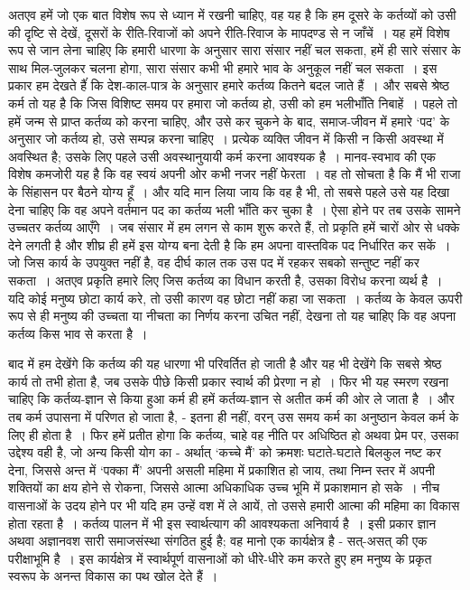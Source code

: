 अतएव हमें जो एक बात विशेष रूप से ध्यान में रखनी चाहिए, वह यह है कि हम दूसरे के कर्तव्यों को उसी की दृष्टि से देखें, दूसरों के रीति-रिवाजों को अपने रीति-रिवाज के मापदण्ड से न जाँचें~। यह हमें विशेष रूप से जान लेना चाहिए कि हमारी धारणा के अनुसार सारा संसार नहीं चल सकता, हमें ही सारे संसार के साथ मिल-जुलकर चलना होगा, सारा संसार कभी भी हमारे भाव के अनुकूल नहीं चल सकता~। इस प्रकार हम देखते हैंं कि देश-काल-पात्र के अनुसार हमारे कर्तव्य कितने बदल जाते हैं~। और सबसे श्रेष्ठ कर्म तो यह है कि जिस विशिष्ट समय पर हमारा जो कर्तव्य हो, उसी को हम भलीभाँति निबाहें~। पहले तो हमें जन्म से प्राप्त कर्तव्य को करना चाहिए, और उसे कर चुकने के बाद, समाज-जीवन में हमारे ‘पद’ के अनुसार जो कर्तव्य हो, उसे सम्पन्न करना चाहिए~। प्रत्येक व्यक्ति जीवन में किसी न किसी अवस्था में अवस्थित है; उसके लिए पहले उसी अवस्थानुयायी कर्म करना आवश्यक है~। मानव-स्वभाव की एक विशेष कमजोरी यह है कि वह स्वयं अपनी ओर कभी नजर नहीं फेरता~। वह तो सोचता है कि मैं भी राजा के सिंहासन पर बैठने योग्य हूँ~। और यदि मान लिया जाय कि वह है भी, तो सबसे पहले उसे यह दिखा देना चाहिए कि वह अपने वर्तमान पद का कर्तव्य भली भाँति कर चुका है~। ऐसा होने पर तब उसके सामने उच्चतर कर्तव्य आएँगे~। जब संसार में हम लगन से काम शुरू करते हैं, तो प्रकृति हमें चारों ओर से धक्के देने लगती है और शीघ्र ही हमें इस योग्य बना देती है कि हम अपना वास्तविक पद निर्धारित कर सकें~। जो जिस कार्य के उपयुक्त नहीं है, वह दीर्घ काल तक उस पद में रहकर सबको सन्तुष्ट नहीं कर सकता~। अतएव प्रकृति हमारे लिए जिस कर्तव्य का विधान करती है, उसका विरोध करना व्यर्थ है~। यदि कोई मनुष्य छोटा कार्य करे, तो उसी कारण वह छोटा नहीं कहा जा सकता~। कर्तव्य के केवल ऊपरी रूप से ही मनुष्य की उच्चता या नीचता का निर्णय करना उचित नहीं, देखना तो यह चाहिए कि वह अपना कर्तव्य किस भाव से करता है~।

बाद में हम देखेंगे कि कर्तव्य की यह धारणा भी परिवर्तित हो जाती है और यह भी देखेंगे कि सबसे श्रेष्ठ कार्य तो तभी होता है, जब उसके पीछे किसी प्रकार स्वार्थ की प्रेरणा न हो~। फिर भी यह स्मरण रखना चाहिए कि कर्तव्य-ज्ञान से किया हुआ कर्म ही हमें कर्तव्य-ज्ञान से अतीत कर्म की ओर ले जाता है~। और तब कर्म उपासना में परिणत हो जाता है, - इतना ही नहीं, वरन् उस समय कर्म का अनुष्ठान केवल कर्म के लिए ही होता है~। फिर हमें प्रतीत होगा कि कर्तव्य, चाहे वह नीति पर अधिष्ठित हो अथवा प्रेम पर, उसका उद्देश्य वही है, जो अन्य किसी योग का - अर्थात् ‘कच्चे मैं’ को क्रमशः घटाते-घटाते बिलकुल नष्ट कर देना, जिससे अन्त में ‘पक्का मैं’ अपनी असली महिमा में प्रकाशित हो जाय, तथा निम्न स्तर में अपनी शक्तियों का क्षय होने से रोकना, जिससे आत्मा अधिकाधिक उच्च भूमि में प्रकाशमान हो सके~। नीच वासनाओं के उदय होने पर भी यदि हम उन्हें वश में ले आयें, तो उससे हमारी आत्मा की महिमा का विकास होता रहता है~। कर्तव्य पालन में भी इस स्वार्थत्याग की आवश्यकता अनिवार्य है~। इसी प्रकार ज्ञान अथवा अज्ञानवश सारी समाजसंस्था संगठित हुई है; वह मानो एक कार्यक्षेत्र है - सत्-असत् की एक परीक्षाभूमि है~। इस कार्यक्षेत्र में स्वार्थपूर्ण वासनाओं को धीरे-धीरे कम करते हुए हम मनुष्य के प्रकृत स्वरूप के अनन्त विकास का पथ खोल देते हैं~।

